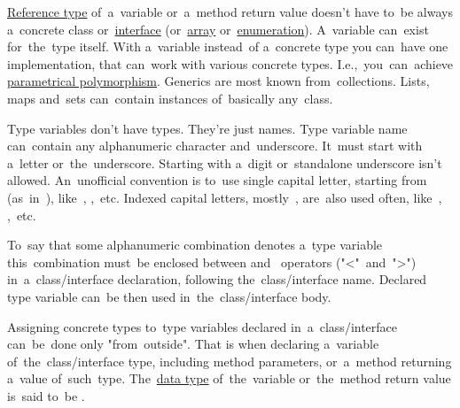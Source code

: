\label{javagenerics}
\hyperref[javareferencetypes]{Reference type} of~a~variable or~a~method return value doesn't have to~be always a~concrete class or~\hyperref[javainterfaces]{interface} (or~\hyperref[javaarray]{array} or~\hyperref[javaenum]{enumeration}).
A~variable can~exist for~the~type itself.
With a~variable instead~of a~concrete type you can~have one implementation, that can~work with various concrete types.
I.e.,~you~can~achieve \hyperref[polymorphism]{parametrical polymorphism}.
Generics are most known from~collections.
Lists, maps and~sets can~contain instances of~basically any~class.

Type variables don't have types.
They're just names.
Type variable name can~contain any alphanumeric character and~underscore.
It~must start with a~letter or~the~underscore.
Starting with a~digit or~standalone underscore isn't allowed.
An~unofficial convention is to~use single capital letter, starting \mbox{from } \mbox{(as in )}, \mbox{like }, \mbox{,  etc.}
Indexed capital letters, \mbox{mostly }, are~also used often, \mbox{like }, \mbox{,  etc.}

To~say that some alphanumeric combination denotes a~type variable this~combination must~be enclosed between  \mbox{and } operators \mbox{("<" and ">")} in~a~class/interface declaration, following the~class/interface name.
Declared type variable can~be then used in~the~class/interface body.

Assigning concrete types to~type variables declared in~a~class/interface can~be~done only \mbox{"from outside"}.
That is when declaring a~variable of~the~class/interface type, including method parameters, or~a~method returning a~value of~such~type.
The~\hyperref[datatypes]{data type} of~the~variable or~the~method return value is~said to~be .
\newpage

